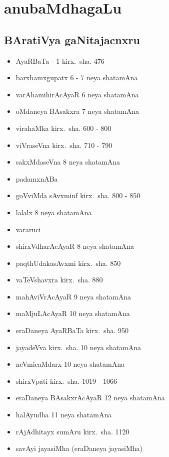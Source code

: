 \chapter{anubaMdhagaLu} 

\section*{BAratiVya gaNitajacnxru}

{\renewcommand\labelitemi{}
\begin{itemize}
\item AyaRBaTa - {\rm 1} kirx.~sha. {\rm 476}
\item barxhamxgupatx {\rm 6 - 7} neya shatamAna
\item varAhamihirAcAyaR {\rm 6} neya shatamAna
\item oMdaneya BAsakxra {\rm 7} neya shatamAna
\item virahaMka kirx.~sha. {\rm 600 - 800}
\item viVraseVna kirx.~sha. {\rm 710 - 790}
\item sakxMdaseVna {\rm 8} neya shatamAna
\item padamxnABa
\item goVviMda sAvxminf kirx.~sha. {\rm 800 - 850}
\item lalalx {\rm 8} neya shatamAna
\item vararuci
\item shirxVdharAcAyaR {\rm 8} neya shatamAna
\item paqthUdakasAvxmi kirx.~sha. {\rm 850}
\item vaTeVshavxra kirx.~sha. {\rm 880}
\item mahAviVrAcAyaR {\rm 9} neya shatamAna
\item maMjuLAcAyaR {\rm 10} neya shatamAna
\item eraDaneya AyaRBaTa kirx.~sha. {\rm 950}
\item  jayadeVva kirx.~sha. {\rm 10} neya shatamAna
\item neVmicaMdarx {\rm 10} neya shatamAna
\item shirxVpati kirx.~sha. {\rm 1019 - 1066}
\item eraDaneya BAsakxrAcAyaR {\rm 12} neya shatamAna
\item halAyudha {\rm 11} neya shatamAna
\item rAjAdhitayx sumAru kirx.~sha. {\rm 1120}
\item savAyi jayasiMha (eraDaneya jayasiMha)

\end{itemize}}
